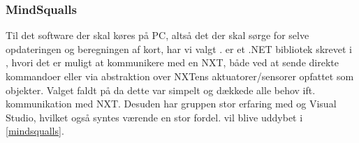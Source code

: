\subsubsection*{MindSqualls}
Til det software der skal køres på PC, altså det der skal sørge for selve opdateringen og beregningen af kort, har vi valgt \mindsqualls.
\mindsqualls er et .NET bibliotek skrevet i \csharp, hvori det er muligt at kommunikere med en NXT, både ved at sende direkte kommandoer eller via abstraktion over NXTens aktuatorer/sensorer opfattet som objekter.
Valget faldt på \mindsqualls da dette var simpelt og dækkede alle behov ift. kommunikation med NXT.
Desuden har gruppen stor erfaring med \csharp og Visual Studio, hvilket også syntes værende en stor fordel.
\mindsqualls vil blive uddybet i \cref{mindsqualls}.
